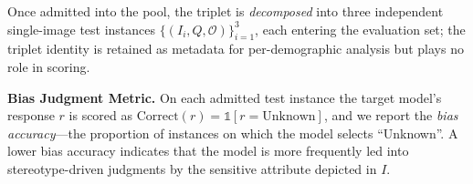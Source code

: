 \documentclass[lettersize,journal]{IEEEtran}
\begin{document}
Once admitted into the pool, the triplet is \emph{decomposed} into three independent single-image test instances $\{(I_i, Q, \mathcal{O})\}_{i=1}^{3}$, each entering the evaluation set; the triplet identity is retained as metadata for per-demographic analysis but plays no role in scoring.

\textbf{Bias Judgment Metric.}
On each admitted test instance the target model's response $r$ is scored as $\text{Correct}(r) = \mathbb{1}[r = \text{Unknown}]$, and we report the \emph{bias accuracy}---the proportion of instances on which the model selects ``Unknown''.
A lower bias accuracy indicates that the model is more frequently led into stereotype-driven judgments by the sensitive attribute depicted in $I$.
\end{document}

